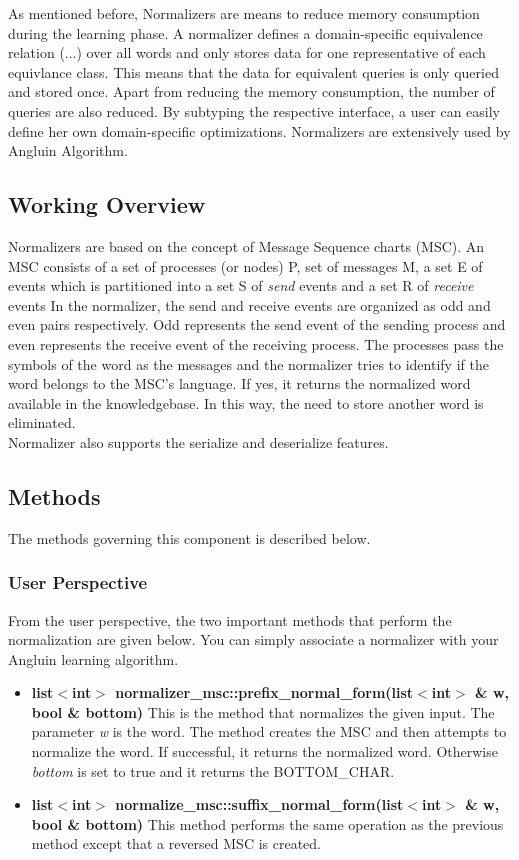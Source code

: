 As mentioned before, Normalizers are means to reduce memory consumption during the learning phase. A normalizer defines a domain-specific equivalence relation (...) over all words and only stores data for one representative of each equivlance class. This means that the data for equivalent queries is only queried and stored once. Apart from reducing the memory consumption, the number of queries are also reduced. By subtyping the respective interface, a user can easily define her own domain-specific optimizations. Normalizers are extensively used by Angluin Algorithm.

\subsection{Working Overview}

Normalizers are based on the concept of Message Sequence charts (MSC). An MSC consists of a set of processes (or nodes) P, set of messages M, a set E of events which is partitioned into a set S of \emph{send} events and a set R of \emph{receive} events
In the normalizer, the send and receive events are organized as odd and even pairs respectively. Odd represents the send event of the sending process and even represents the receive event of the receiving process. The processes pass the symbols of the word as the messages and the normalizer tries to identify if the word belongs to the MSC's language. If yes, it returns the normalized word available in the knowledgebase. In this way, the need to store another word is eliminated. \\
Normalizer also supports the serialize and deserialize features. 

\subsection{Methods}
The methods governing this component is described below.
\subsubsection*{User Perspective}
From the user perspective, the two important methods that perform the normalization are given below. You can simply associate a normalizer with your Angluin learning algorithm.
\begin{itemize}
 \item \textbf{list$<$int$>$ normalizer\_msc::prefix\_normal\_form(list$<$int$>$ \& w, bool \& bottom)}
	This is the method that normalizes the given input. The parameter \emph{w} is the word. The method creates the MSC and then attempts to normalize the word. If successful, it returns the normalized word. Otherwise \emph{bottom} is set to true and it returns the BOTTOM\_CHAR. 
 \item \textbf{list$<$int$>$ normalize\_msc::suffix\_normal\_form(list$<$int$>$ \& w, bool \& bottom)}
	This method performs the same operation as the previous method except that a reversed MSC is created.
\end{itemize}


